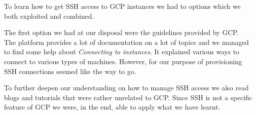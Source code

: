 To learn how to get SSH access to GCP instances we had to options
which we both exploited and combined.

The first option we had at our disposal were the guidelines provided
by GCP. The platform provides a lot of documentation on a lot of
topics and we managed to find some help about \textit{Connecting to
instances}\cite{GCP-connect}. It explained various ways to connect to
various types of machines. However, for our purpose of provisioning
SSH connections seemed like the way to go.

To further deepen our understanding on how to manage SSH access we
also read blogs\cite{ssh-tutorial-2}\cite{ssh-tutorial-3} and
tutorials\cite{ssh-tutorial-1} that were rather unrelated to GCP.
Since SSH is not a specific feature of GCP we were, in the end, able
to apply what we have learnt.
